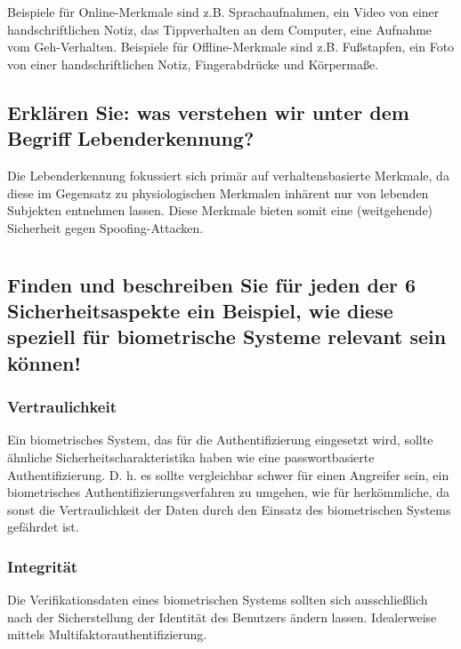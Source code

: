 \documentclass{article}
\begin{document}
Beispiele für Online-Merkmale sind z.B. Sprachaufnahmen, ein Video von einer handschriftlichen Notiz, das 
Tippverhalten an dem Computer, eine Aufnahme vom Geh-Verhalten. Beispiele für Offline-Merkmale sind z.B. 
Fußstapfen, ein Foto von einer handschriftlichen Notiz, Fingerabdrücke und Körpermaße.

\subsection{Erklären Sie: was verstehen wir unter dem Begriff Lebenderkennung?}

Die Lebenderkennung fokussiert sich primär auf verhaltensbasierte Merkmale, da diese im Gegensatz zu
physiologischen Merkmalen inhärent nur von lebenden Subjekten entnehmen lassen. Diese Merkmale bieten 
somit eine (weitgehende) Sicherheit gegen Spoofing-Attacken.

\newpage

\section{}

\subsection{Finden und beschreiben Sie für jeden der 6 Sicherheitsaspekte ein Beispiel, wie diese speziell für biometrische Systeme relevant sein k\"onnen!
}

\subsubsection*{Vertraulichkeit}

Ein biometrisches System, das für die Authentifizierung eingesetzt wird, sollte ähnliche 
Sicherheitscharakteristika haben wie eine passwortbasierte Authentifizierung. D. h. es sollte vergleichbar
schwer für einen Angreifer sein, ein biometrisches Authentifizierungsverfahren zu umgehen, wie für  
herkömmliche, da sonst die Vertraulichkeit der Daten durch den Einsatz des biometrischen Systems
gefährdet ist.

\subsubsection*{Integrität}

Die Verifikationsdaten eines biometrischen Systems sollten sich ausschließlich nach der 
Sicherstellung der Identität des Benutzers ändern lassen. Idealerweise mittels 
Multifaktorauthentifizierung.
\end{document}
